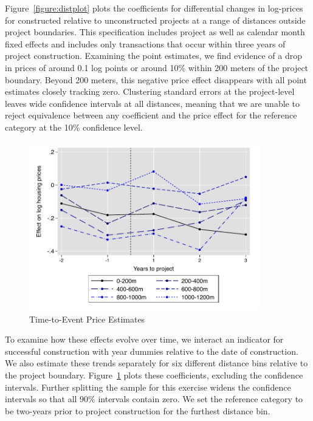 \documentclass[12pt]{article}
\begin{document}
Figure~\ref{figure:distplot} plots the coefficients for differential changes in log-prices for constructed relative to unconstructed projects at a range of distances outside project boundaries.  This specification includes project as well as calendar month fixed effects and includes only transactions that occur within three years of project construction.  Examining the point estimates, we find evidence of a drop in prices of around 0.1 log points or around 10\% within 200 meters of the project boundary.  Beyond 200 meters, this negative price effect disappears with all point estimates closely tracking zero.  Clustering standard errors at the project-level leaves wide confidence intervals at all distances, meaning that we are unable to reject equivalence between any coefficient and the price effect for the reference category at the 10\% confidence level.

\begin{figure}
\caption{Time-to-Event Price Estimates}\label{figure:timeplot}
\centering
\includegraphics[width=0.9\textwidth,trim={0cm .1cm 0cm 0.1cm},clip=true]{figures/DDDplot_pertime_alt}
\vspace{-2mm}
\end{figure}

To examine how these effects evolve over time, we interact an indicator for successful construction with year dummies relative to the date of construction.  We also estimate these trends separately for six different distance bins relative to the project boundary.  Figure~\ref{figure:timeplot} plots these coefficients, excluding the confidence intervals.  Further splitting the sample for this exercise widens the confidence intervals so that all 90\% intervals contain zero.  We set the reference category to be two-years prior to project construction for the furthest distance bin.  
\end{document}
